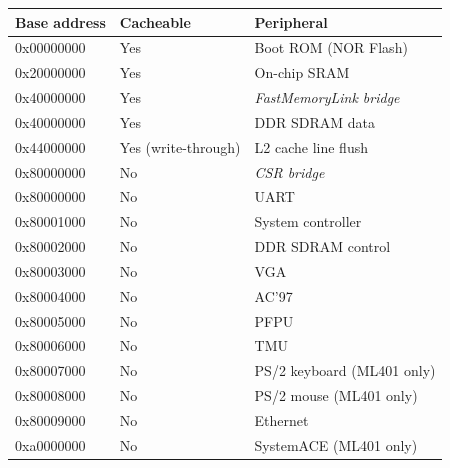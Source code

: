 \documentclass[a4paper,11pt]{article}
\begin{document}
\begin{tabularx}{\textwidth}{|l|l|X|}
\hline
\bf{Base address} & \bf{Cacheable} & \bf{Peripheral} \\
\hline
0x00000000 & Yes & Boot ROM (NOR Flash) \\
\hline
0x20000000 & Yes & On-chip SRAM \\
\hline
0x40000000 & Yes & \textit{FastMemoryLink bridge} \\
\hline
\hspace{5mm} 0x40000000 & Yes & \hspace{5mm} DDR SDRAM data \\
\hline
\hspace{5mm} 0x44000000 & Yes (write-through) & \hspace{5mm} L2 cache line flush \\
\hline
0x80000000 & No & \textit{CSR bridge} \\
\hline
\hspace{5mm} 0x80000000 & No & \hspace{5mm} UART \\
\hline
\hspace{5mm} 0x80001000 & No & \hspace{5mm} System controller \\
\hline
\hspace{5mm} 0x80002000 & No & \hspace{5mm} DDR SDRAM control \\
\hline
\hspace{5mm} 0x80003000 & No & \hspace{5mm} VGA \\
\hline
\hspace{5mm} 0x80004000 & No & \hspace{5mm} AC'97 \\
\hline
\hspace{5mm} 0x80005000 & No & \hspace{5mm} PFPU \\
\hline
\hspace{5mm} 0x80006000 & No & \hspace{5mm} TMU \\
\hline
\hspace{5mm} 0x80007000 & No & \hspace{5mm} PS/2 keyboard (ML401 only) \\
\hline
\hspace{5mm} 0x80008000 & No & \hspace{5mm} PS/2 mouse (ML401 only) \\
\hline
\hspace{5mm} 0x80009000 & No & \hspace{5mm} Ethernet \\
\hline
0xa0000000 & No & SystemACE (ML401 only) \\
\hline
\end{tabularx}
\end{document}
